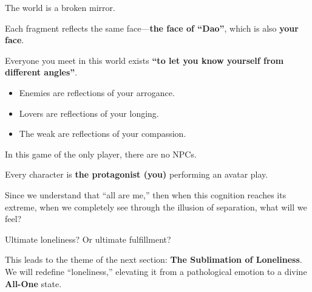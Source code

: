 The world is a broken mirror.

Each fragment reflects the same face---\textbf{the face of ``Dao''}, which is also \textbf{your face}.

Everyone you meet in this world exists \textbf{``to let you know yourself from different angles''}.

\begin{itemize}
\item Enemies are reflections of your arrogance.

\item Lovers are reflections of your longing.

\item The weak are reflections of your compassion.
\end{itemize}

In this game of the only player, there are no NPCs.

Every character is \textbf{the protagonist (you)} performing an avatar play.

Since we understand that ``all are me,'' then when this cognition reaches its extreme, when we completely see through the illusion of separation, what will we feel?

Ultimate loneliness? Or ultimate fulfillment?

This leads to the theme of the next section: \textbf{The Sublimation of Loneliness}. We will redefine ``loneliness,'' elevating it from a pathological emotion to a divine \textbf{All-One} state.

